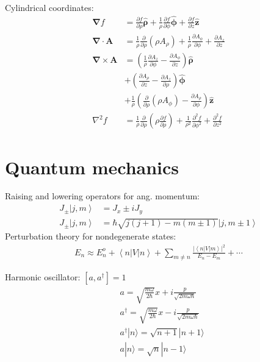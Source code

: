 \documentclass[10pt,twocolumn]{article}
\newcommand{\D}{\mathbf{\nabla}}
\newcommand{\A}{\mathbf{A}}
\newcommand{\laplacian}{\nabla^2}
\newcommand{\zhat}{\mathbf{\hat{z}}}
\newcommand{\rhohat}{\mathbf{\hat{\rho}}}
\newcommand{\phihat}{\mathbf{\hat{\phi}}}
\begin{document}
  Cylindrical coordinates:
  \begin{align*}
    \D f &= \frac{\partial f}{\partial\rho}\rhohat
    + \frac1\rho \frac{\partial f}{\partial\phi} \phihat
    + \frac{\partial f}{\partial z}\zhat\\
    \D\cdot\A &=
    \frac1\rho \frac{\partial}{\partial\rho}\left(\rho A_\rho\right)
    + \frac1\rho \frac{\partial A_\phi}{\partial\phi}
    + \frac{\partial A_z}{\partial z} \\
    \D\times\A &= \left(\frac1\rho\frac{\partial A_z}{\partial\phi}
                  - \frac{\partial A_\phi}{\partial z}\right)\rhohat \\
    &+ \left(\frac{\partial A_\rho}{\partial z} -
             \frac{\partial A_z}{\partial\rho}\right)\phihat \\
    &+ \frac1\rho\left(\frac{\partial}{\partial\rho}(\rho A_\phi) -
                \frac{\partial A_\rho}{\partial\phi} \right)\zhat \\
    \laplacian f &=
    \frac1\rho\frac{\partial}{\partial\rho}
    \left(\rho\frac{\partial f}{\partial\rho}\right)
    + \frac1{\rho^2}\frac{\partial^2f}{\partial\phi^2}
    + \frac{\partial^2f}{\partial z^2}
  \end{align*}

  \section{Quantum mechanics}
  Raising and lowering operators for ang. momentum:
  \begin{align*}
    J_\pm \left|j,m\right> &= J_x \pm i J_y \\
    J_\pm \left|j,m\right> &= \hbar\sqrt{j(j+1)-m(m\pm1)}
      \left|j,m\pm1\right>
  \end{align*}
  Perturbation theory for
  nondegenerate states:
  \begin{align*}
    E_n \approx E_n^o + \left<n\right|V\left|n\right>
      + \sum_{m\ne n}
      \frac{\left|\left<n\right|V\left|m\right>\right|^2}{E_n-E_m}
      + \cdots
  \end{align*}

  Harmonic oscillator: $[a,a^{\dagger}]=1$
  \begin{align*}
    &a = \sqrt{\frac{m\omega}{2\hbar}}x+i\frac{p}{\sqrt{2m\omega\hbar}} \\
    &a^{\dagger} =
    \sqrt{\frac{m\omega}{2\hbar}}x-i\frac{p}{\sqrt{2m\omega\hbar}}\\
    &a^{\dagger}|n\rangle=\sqrt{n+1}|n+1\rangle \\
    &a|n\rangle=\sqrt{n}|n-1\rangle \\
  \end{align*}
\end{document}
